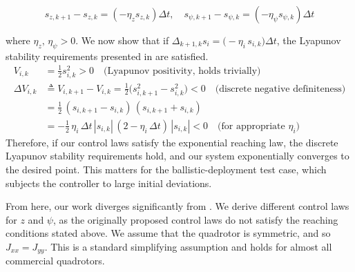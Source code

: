 \documentclass[conf]{new-aiaa}
\begin{document}
\small
\begin{equation}
s_{z,k+1} - s_{z,k} = \left(-\eta_z s_{z,k}\right) \Delta t, \quad
s_{\psi,k+1} - s_{\psi,k} = \left(-\eta_\psi s_{\psi,k}\right) \Delta t
\end{equation}
\normalsize

where $\eta_z,\, \eta_\psi > 0$. We now show that if $\Delta_{k+1,k} s_i = \bigl(-\eta_i\, s_{i,k}\bigr) \Delta t$, the Lyapunov stability requirements presented in \cite{refs:Xiong2016} are satisfied.
\small
\begin{equation}
\label{eq:discrete-lyapunov}
\begin{aligned}
V_{i,k} &= \tfrac{1}{2} s_{i,k}^2 > 0 \quad \text{(Lyapunov positivity, holds trivially)} \\
\Delta V_{i,k} &\triangleq V_{i,k+1} - V_{i,k} = \tfrac{1}{2}\bigl(s_{i,k+1}^2 - s_{i,k}^2\bigr) < 0 \quad \text{(discrete negative definiteness)} \\
&= \tfrac{1}{2}\,(s_{i,k+1} - s_{i,k})\,(s_{i,k+1} + s_{i,k}) \\
&= -\tfrac{1}{2}\,\eta_i\,\Delta t\,|s_{i,k}|\,(2 - \eta_i\,\Delta t)\,|s_{i,k}| < 0 \quad \text{(for appropriate $\eta_i$)}
\end{aligned}
\end{equation}
\normalsize
Therefore, if our control laws satisfy the exponential reaching law, the discrete Lyapunov stability requirements hold, and our system exponentially converges to the desired point. This matters for the ballistic-deployment test case, which subjects the controller to large initial deviations.

From here, our work diverges significantly from \cite{refs:Xiong2016}. We derive different control laws for $z$ and $\psi$, as the originally proposed control laws do not satisfy the reaching conditions stated above. We assume that the quadrotor is symmetric, and so $J_{xx} = J_{yy}$. This is a standard simplifying assumption and holds for almost all commercial quadrotors.
\end{document}
